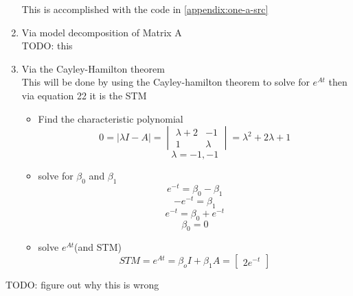 \begin{enumerate}
    This is accomplished with the code in \autoref{appendix:one-a-src}
  \item Via model decomposition of Matrix A \\
    {\LARGE \color{red} TODO: this}
  \item Via the Cayley-Hamilton theorem \\
    This will be done by using the Cayley-hamilton theorem to solve for $e^{At}$ then via equation 22 it is the
    STM
    \begin{itemize}
    \item Find the characteristic polynomial \\
      \begin{equation}
        0 = |\lambda I - A| =
        \begin{vmatrix}
          \lambda +2 & -1 \\
          1 & \lambda 
        \end{vmatrix} =
        \lambda^2 + 2\lambda + 1
      \end{equation}
      \begin{equation}
        \lambda = -1,-1
      \end{equation}
    \item solve for $\beta_0$ and $\beta_1$ \\
      \begin{equation}
        e^{-t} = \beta_0 - \beta_1
      \end{equation}
      \begin{equation}
        -e^{-t} = \beta_1
      \end{equation}
      \begin{equation}
        e^{-t} = \beta_0 + e^{-t}
      \end{equation}
      \begin{equation}
        \beta_0 = 0
      \end{equation}
    \item solve $e^{At}$(and STM)
      \begin{equation}
        STM = e^{At} = \beta_oI + \beta_1A =
        \begin{bmatrix}
          2e^{-t}
        \end{bmatrix}
      \end{equation}
    \end{itemize}
  \end{enumerate}
  {\LARGE \color{red} TODO: figure out why this is wrong} 